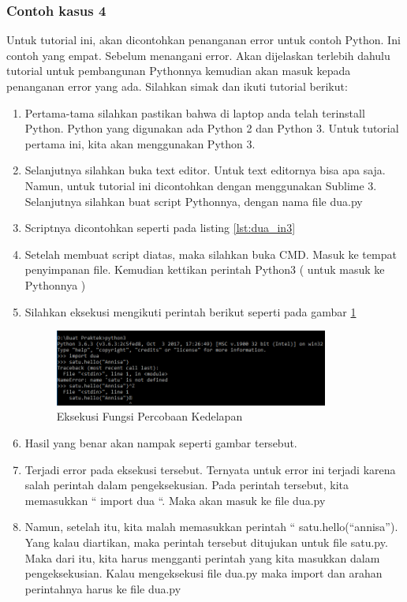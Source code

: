 \subsubsection{Contoh kasus 4}
 Untuk tutorial ini, akan dicontohkan penanganan error untuk contoh Python. Ini contoh yang empat. Sebelum menangani error. Akan dijelaskan terlebih dahulu tutorial untuk pembangunan Pythonnya kemudian akan masuk kepada penanganan error yang ada. Silahkan simak dan ikuti tutorial berikut: 
\begin{enumerate}
\item Pertama-tama silahkan pastikan bahwa di laptop anda telah terinstall Python. Python yang digunakan ada Python 2 dan Python 3. Untuk tutorial pertama ini, kita akan menggunakan Python 3.
\item Selanjutnya silahkan buka text editor. Untuk text editornya bisa apa saja. Namun, untuk tutorial ini dicontohkan dengan menggunakan Sublime 3. Selanjutnya silahkan buat script Pythonnya, dengan nama file dua.py
\item Scriptnya dicontohkan seperti pada listing \ref{lst:dua_in3}

\item Setelah membuat script diatas, maka silahkan buka CMD. Masuk ke tempat penyimpanan file. Kemudian kettikan perintah Python3 ( untuk masuk ke Pythonnya )
\item Silahkan eksekusi mengikuti perintah berikut seperti pada gambar \ref{fig:eksekusi_fungsi8}
\begin{figure}[!htbp]
	\centerline{\includegraphics[width=0.85\textwidth]{figures/8/eksekusi_fungsi8.png}}
	\caption{Eksekusi Fungsi Percobaan Kedelapan}
	\label{fig:eksekusi_fungsi8}
\end{figure}
\item Hasil yang benar akan nampak seperti gambar tersebut.
\item Terjadi error pada eksekusi tersebut. Ternyata untuk error ini terjadi karena salah perintah dalam pengeksekusian. Pada perintah tersebut, kita memasukkan “ import dua “. Maka akan masuk ke file dua.py
\item Namun, setelah itu, kita malah memasukkan perintah “ satu.hello(“annisa”). Yang kalau diartikan, maka perintah tersebut ditujukan untuk file satu.py. Maka dari itu, kita harus mengganti perintah yang kita masukkan dalam pengeksekusian. Kalau mengeksekusi file dua.py maka import dan arahan perintahnya harus ke file dua.py

\end{enumerate}
